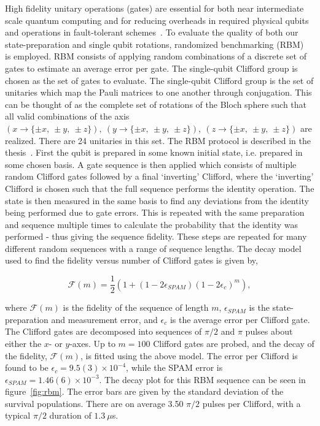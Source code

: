     High fidelity unitary operations (gates) are essential for both near
    intermediate scale quantum computing and for reducing overheads in required
    physical qubits and operations in fault-tolerant
    schemes~\cite{steane_overhead_2003}. To evaluate the quality of both our
    state-preparation and single qubit rotations, randomized benchmarking
    (RBM)~\cite{knill_randomized_2008, magesan_scalable_2011} is employed.  RBM consists of
    applying random combinations of a discrete set of gates to
    estimate an average error per gate.  The single-qubit Clifford
    group is chosen as the set of gates to evaluate. The single-qubit Clifford group is
    the set of unitaries which map the Pauli matrices to one another through
    conjugation. This can be thought of as the complete set of rotations of the
    Bloch sphere such that all valid combinations of the axis $(x \rightarrow
    \{\pm x,~\pm y,~\pm z\}),~(y \rightarrow \{\pm x,~\pm y,~\pm z\}),~(z
    \rightarrow \{\pm x,~\pm y,~\pm z\})$ are realized. There are 24 unitaries
    in this set. The RBM protocol is described in the
    thesis~\cite{hughes_benchmarking_2021}.
    First the qubit is prepared in some known initial state, i.e. prepared in
    some chosen basis. A gate sequence is then applied which consists of
    multiple random Clifford gates followed by a final `inverting' Clifford,
    where the `inverting' Clifford is chosen such that the full sequence
    performs the identity operation. The state is then measured in the same
    basis to find any deviations from the identity being performed due to gate
    errors. This is repeated with the same preparation and sequence multiple
    times to calculate the probability that the identity was performed - thus
    giving the sequence fidelity. These steps are repeated for many different
    random sequences with a range of sequence lengths. The decay model used to find 
    the fidelity versus number of Clifford gates is given by,

    \begin{equation}
    \label{eq:RBM_decay}
        \mathcal{F}(m) = \frac{1}{2}\left( 1+(1-2\epsilon_{SPAM})(1-2\epsilon_c)^m\right),
    \end{equation}

    \noindent where $\mathcal{F}(m)$ is the fidelity of the sequence of length $m$,
    $\epsilon_{SPAM}$ is the state-preparation and measurement error, and
    $\epsilon_c$ is the average error per Clifford gate.  The Clifford gates are decomposed into
    sequences of $\pi/2$ and $\pi$ pulses about either the $x$- or $y$-axes. Up to $m=100$ Clifford gates are probed, and the decay of the fidelity, $\mathcal{F}(m)$, is fitted using the above model.
    The error per Clifford is found to be $\epsilon_c = 9.5(3) \times 10^{-4}$,
    while the SPAM error is $\epsilon_{SPAM} = 1.46(6) \times 10^{-3}$. The decay plot for
    this RBM sequence can be seen in figure~\ref{fig:rbm}. The error bars
    are given by the standard deviation of the survival populations. There are on average 3.50 $\pi/2$ pulses per Clifford, with a typical $\pi/2$ duration of $1.3~\mu$s.\\


